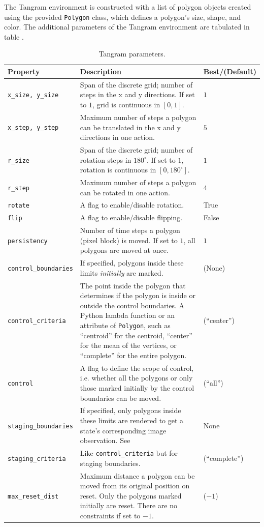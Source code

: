 The Tangram environment is constructed with a list of polygon objects created using the provided \texttt{Polygon} class, which defines a polygon's size, shape, and color.
The additional parameters of the Tangram environment are tabulated in table .
\begin{table}[H]
    \centering
    \caption{Tangram parameters.}
    \begin{tabularx}{\textwidth}{C{3.9cm} L C{2cm}}
        \hline
        Property & Description & Best/(Default)\\
        \hline
        \texttt{x\_size, y\_size} & Span of the discrete grid; number of steps in the x and y directions. If set to \(1\), grid is continuous in \([0, 1]\). & \(1\)\\
        \texttt{x\_step, y\_step} & Maximum number of steps a polygon can be translated in the x and y directions in one action. & \(5\)\\
        \texttt{r\_size} & Span of the discrete grid; number of rotation steps in \(180^\circ\). If set to \(1\), rotation is continuous in \([0, 180^\circ]\). & \(1\)\\
        \texttt{r\_step} & Maximum number of steps a polygon can be rotated in one action. & \(4\)\\
        \texttt{rotate} & A flag to enable/disable rotation. & True\\
        \texttt{flip} & A flag to enable/disable flipping. & False\\
        \texttt{persistency} & Number of time steps a polygon (pixel block) is moved. If set to \(1\), all polygons are moved at once. & \(1\)\\
        \texttt{control\_boundaries} & If specified, polygons inside these limits \emph{initially} are marked. & (None)\\
        \texttt{control\_criteria} & The point inside the polygon that determines if the polygon is inside or outside the control boundaries. A Python lambda function or an attribute of \texttt{Polygon}, such as ``centroid'' for the centroid, ``center'' for the mean of the vertices, or ``complete'' for the entire polygon. & (``center'')\\
        \texttt{control} & A flag to define the scope of control, i.e. whether all the polygons or only those marked initially by the control boundaries can be moved. & (``all'')\\
        \texttt{staging\_boundaries} & If specified, only polygons inside these limits are rendered to get a state's corresponding image observation. See  & None\\
        \texttt{staging\_criteria} & Like \texttt{control\_criteria} but for staging boundaries. & (``complete'')\\
        \texttt{max\_reset\_dist} & Maximum distance a polygon can be moved from its original position on reset. Only the polygons marked initially are reset. There are no constraints if set to \(-1\). & (\(-1\))\\
        \hline
    \end{tabularx}
    \label{tab:tangram-params}
\end{table}

